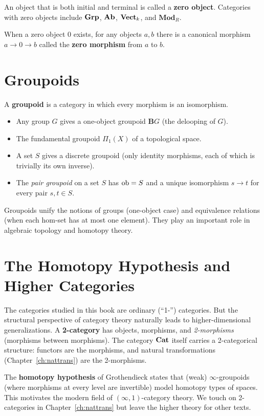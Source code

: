 \begin{definition}
An object that is both initial and terminal is called a \textbf{zero object}. Categories with zero objects include $\mathbf{Grp}$, $\mathbf{Ab}$, $\mathbf{Vect}_k$, and $\mathbf{Mod}_R$.
\end{definition}

When a zero object $0$ exists, for any objects $a, b$ there is a canonical morphism $a \to 0 \to b$ called the \textbf{zero morphism} from $a$ to $b$.

\section{Groupoids}

\begin{definition}[Groupoid]
A \textbf{groupoid} is a category in which every morphism is an isomorphism.
\end{definition}

\begin{example}
\leavevmode
\begin{itemize}
  \item Any group $G$ gives a one-object groupoid $\mathbf{B}G$ (the delooping of $G$).
  \item The fundamental groupoid $\Pi_1(X)$ of a topological space.
  \item A set $S$ gives a discrete groupoid (only identity morphisms, each of which is trivially its own inverse).
  \item The \emph{pair groupoid} on a set $S$ has $\operatorname{ob} = S$ and a unique isomorphism $s \to t$ for every pair $s, t \in S$.
\end{itemize}
\end{example}

Groupoids unify the notions of groups (one-object case) and equivalence relations (when each hom-set has at most one element). They play an important role in algebraic topology and homotopy theory.

\section{The Homotopy Hypothesis and Higher Categories}

\begin{remark}
The categories studied in this book are ordinary (``1-'') categories. But the structural perspective of category theory naturally leads to higher-dimensional generalizations. A \textbf{2-category} has objects, morphisms, and \emph{2-morphisms} (morphisms between morphisms). The category $\mathbf{Cat}$ itself carries a 2-categorical structure: functors are the morphisms, and natural transformations (Chapter~\ref{ch:nattrans}) are the 2-morphisms.

The \textbf{homotopy hypothesis} of Grothendieck states that (weak) $\infty$-groupoids (where morphisms at every level are invertible) model homotopy types of spaces. This motivates the modern field of $(\infty,1)$-category theory. We touch on 2-categories in Chapter~\ref{ch:nattrans} but leave the higher theory for other texts.
\end{remark}

